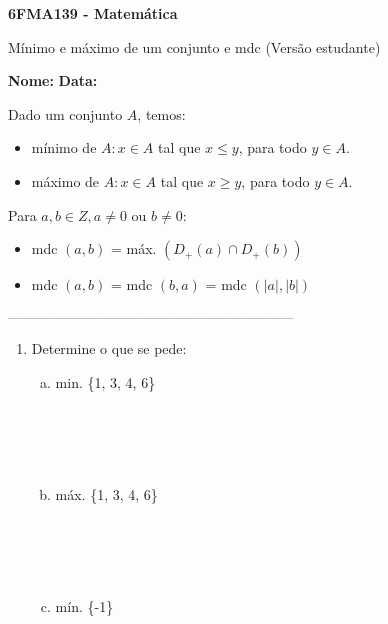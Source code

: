 \documentclass[a4paper,14pt]{article}
\begin{document}
	
	\noindent\textbf{6FMA139 - Matemática} 
	
	\begin{center}Mínimo e máximo de um conjunto e mdc (Versão estudante)
	\end{center}
	
	\noindent\textbf{Nome:} \underline{\hspace{10cm}}
	\noindent\textbf{Data:} \underline{\hspace{4cm}}
	
	
	\begin{multicols}{2}
	    \noindent Dado um conjunto $A$, temos:
	    \begin{itemize}
	    	\item mínimo de $A: x \in A$ tal que $x \leq y$, para todo $y \in A$.
	    	\item máximo de $A: x \in A$ tal que $x \geq y$, para todo $y \in A$.
	    \end{itemize}
	    \noindent Para $a, b \in Z, a \neq 0$ ou $b \neq 0$:
	    \begin{itemize}
	    	\item mdc $(a, b)$ = máx. $(D_+(a) \cap D_+(b))$
	    	\item mdc $(a, b)$ = mdc $(b, a)$ = mdc $(|a|,|b|)$
	    \end{itemize}
		\noindent\textsubscript{--------------------------------------------------------------------------}
		\begin{enumerate} 
			\item Determine o que se pede:
			\begin{enumerate}[a)]
				\item min. \{1, 3, 4, 6\} \\\\\\\\\\
				\item máx. \{1, 3, 4, 6\} \\\\\\\\\\
				\item mín. \{-1\} \\\\\\\\\\

\end{enumerate}
\end{enumerate}
\end{multicols}
\end{document}
